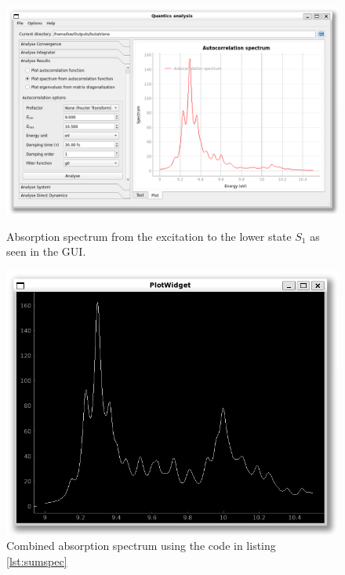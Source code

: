 \documentclass[12pt]{article}
\begin{document}
\begin{figure}[h]
    \centering
    \begin{minipage}[t]{.53\textwidth}
        \centering
        \includegraphics[width=\textwidth]{img/but_spectra_gui.png}
        \caption{Absorption spectrum from the excitation to the lower state \(S_1\) as seen in the GUI.}
        \label{fig:but_spectra_gui}
    \end{minipage}\hfill\begin{minipage}[t]{.42\textwidth}
        \centering
        \includegraphics[width=\textwidth]{img/but_spectra_python.png}
        \caption{Combined absorption spectrum using the code in listing \ref{lst:sumspec}}
        \label{fig:but_spectra_python}
    \end{minipage}
\end{figure}
\end{document}
